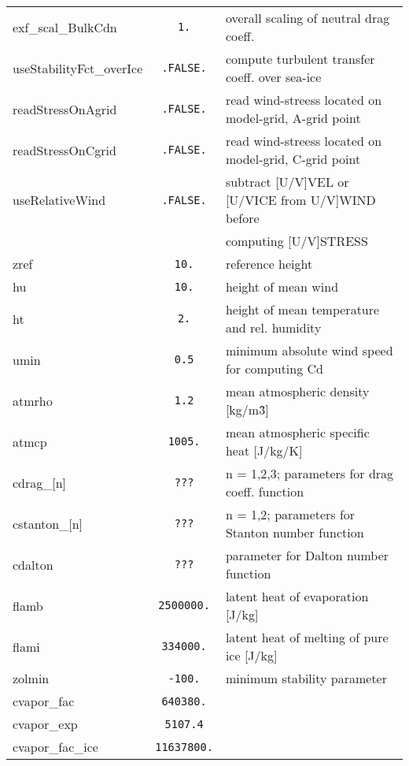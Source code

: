 \begin{table}[!ht]
{\begin{tabular}{|l|c|l|}
        exf\_scal\_BulkCdn & \texttt{1.} & 
          overall scaling of neutral drag coeff. \\
        useStabilityFct\_overIce  & \texttt{.FALSE.} & 
          compute turbulent transfer coeff. over sea-ice \\
        readStressOnAgrid & \texttt{.FALSE.} & 
          read wind-streess located on model-grid, A-grid point \\
        readStressOnCgrid & \texttt{.FALSE.} & 
          read wind-streess located on model-grid, C-grid point \\
        useRelativeWind & \texttt{.FALSE.} & 
          subtract [U/V]VEL or [U/VICE from U/V]WIND before \\
        ~ & ~ &  computing [U/V]STRESS \\
        zref & \texttt{10.} & 
          reference height \\
        hu & \texttt{10.} & 
          height of mean wind \\
        ht & \texttt{2.} & 
          height of mean temperature and rel. humidity \\
        umin & \texttt{0.5} & 
          minimum absolute wind speed for computing Cd \\
        atmrho & \texttt{1.2} & 
          mean atmospheric density [kg/m\^3] \\
        atmcp & \texttt{1005.} & 
          mean atmospheric specific heat [J/kg/K] \\
        cdrag\_[n] & \texttt{???} & 
          n = 1,2,3; parameters for drag coeff. function \\
        cstanton\_[n] & \texttt{???} & 
          n = 1,2; parameters for Stanton number function \\
        cdalton & \texttt{???} & 
          parameter for Dalton number function \\
        flamb & \texttt{2500000.} & 
          latent heat of evaporation [J/kg] \\
        flami & \texttt{334000.} & 
          latent heat of melting of pure ice [J/kg] \\
        zolmin & \texttt{-100.} & 
          minimum stability parameter \\
        cvapor\_fac & \texttt{640380.} & 
          ~ \\
        cvapor\_exp & \texttt{5107.4} & 
          ~ \\
        cvapor\_fac\_ice & \texttt{11637800.} & 
          ~ \\

\end{tabular}}
\end{table}
